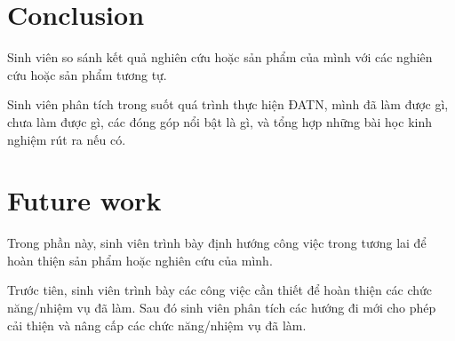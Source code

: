 \documentclass[../Main.tex]{subfiles}
\begin{document}
\section{Conclusion}
Sinh viên so sánh kết quả nghiên cứu hoặc sản phẩm của mình với các nghiên cứu hoặc sản phẩm tương tự.

Sinh viên phân tích trong suốt quá trình thực hiện ĐATN, mình đã làm được gì, chưa làm được gì, các đóng góp nổi bật là gì, và tổng hợp những bài học kinh nghiệm rút ra nếu có.

\section{Future work}
Trong phần này, sinh viên trình bày định hướng công việc trong tương lai để hoàn thiện sản phẩm hoặc nghiên cứu của mình.

Trước tiên, sinh viên trình bày các công việc cần thiết để hoàn thiện các chức năng/nhiệm vụ đã làm. Sau đó sinh viên phân tích các hướng đi mới cho phép cải thiện và nâng cấp các chức năng/nhiệm vụ đã làm.
\end{document}
